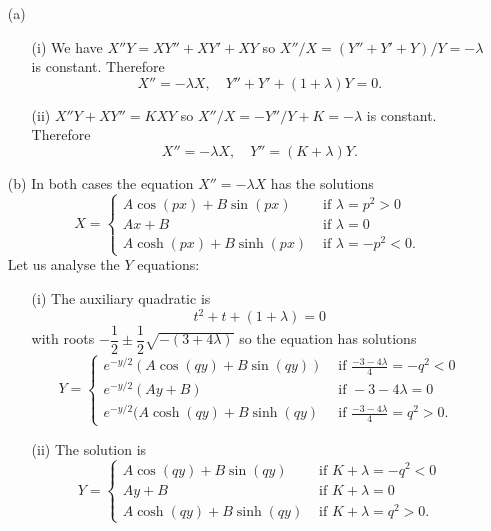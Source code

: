 \documentclass[12pt]{article}
\begin{document}
\begin{answer}
\begin{enumerate}
\item[(a)]
\begin{enumerate}
\item[(i)] We have $X''Y=XY''+XY'+XY$ so $X''/X=(Y''+Y'+Y)/Y=-\lambda$ is constant. Therefore
\[X''=-\lambda X,\quad Y''+Y'+(1+\lambda)Y=0.\]
\item[(ii)] $X''Y+XY''=KXY$ so $X''/X=-Y''/Y+K=-\lambda$ is constant. Therefore
\[X''=-\lambda X,\quad Y''=(K+\lambda)Y.\]
\end{enumerate}
\item[(b)]
In both cases the equation $X''=-\lambda X$ has the solutions
\[X=\begin{cases}
A\cos(px)+B\sin(px)&\mbox{ if }\lambda=p^2>0\\
Ax+B&\mbox{ if }\lambda=0\\
A\cosh(px)+B\sinh(px)&\mbox{ if }\lambda=-p^2<0.
\end{cases}\]
Let us analyse the $Y$ equations:
\begin{enumerate}
\item[(i)] The auxiliary quadratic is
\[t^2+t+(1+\lambda)=0\]
with roots $-\dfrac{1}{2}\pm\dfrac{1}{2}\sqrt{-(3+4\lambda)}$ so the equation has solutions
\[Y=\begin{cases}
e^{-y/2}(A\cos(qy)+B\sin(qy))&\mbox{ if }\frac{-3-4\lambda}{4}=-q^2<0\\
e^{-y/2}(Ay+B)&\mbox{ if }-3-4\lambda=0\\
e^{-y/2}(A\cosh(qy)+B\sinh(qy)&\mbox{ if }\frac{-3-4\lambda}{4}=q^2>0.
\end{cases}\]
\item[(ii)] The solution is
\[Y=\begin{cases}
A\cos(qy)+B\sin(qy)&\mbox{ if }K+\lambda=-q^2<0\\
Ay+B&\mbox{ if }K+\lambda=0\\
A\cosh(qy)+B\sinh(qy)&\mbox{ if }K+\lambda=q^2>0.
\end{cases}\]
\end{enumerate}
\end{enumerate}
\end{answer}
\newpage

\vspace{0.5cm}
\end{document}

